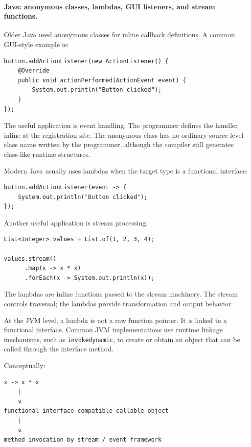 \paragraph{Java: anonymous classes, lambdas, GUI listeners, and stream functions.}

Older Java used anonymous classes for inline callback definitions. A common GUI-style example is:

\begin{verbatim}
button.addActionListener(new ActionListener() {
    @Override
    public void actionPerformed(ActionEvent event) {
        System.out.println("Button clicked");
    }
});
\end{verbatim}

The useful application is event handling. The programmer defines the handler inline at the registration site. The anonymous class has no ordinary source-level class name written by the programmer, although the compiler still generates class-like runtime structures.

Modern Java usually uses lambdas when the target type is a functional interface:

\begin{verbatim}
button.addActionListener(event -> {
    System.out.println("Button clicked");
});
\end{verbatim}

Another useful application is stream processing:

\begin{verbatim}
List<Integer> values = List.of(1, 2, 3, 4);

values.stream()
      .map(x -> x * x)
      .forEach(x -> System.out.println(x));
\end{verbatim}

The lambdas are inline functions passed to the stream machinery. The stream controls traversal; the lambdas provide transformation and output behavior.

At the JVM level, a lambda is not a raw function pointer. It is linked to a functional interface. Common JVM implementations use runtime linkage mechanisms, such as \texttt{invokedynamic}, to create or obtain an object that can be called through the interface method.

Conceptually:

\begin{verbatim}
x -> x * x
    |
    v
functional-interface-compatible callable object
    |
    v
method invocation by stream / event framework
\end{verbatim}

